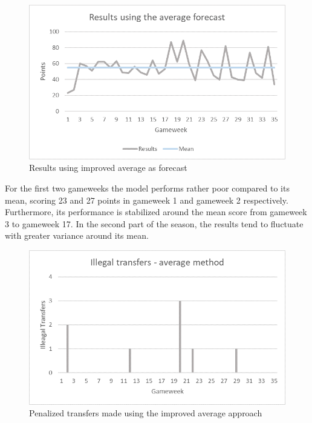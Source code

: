 \begin{figure}[H]
    \centering
    \includegraphics[scale=0.80]{fig/chapter_7/Results_average.png}
    \caption{Results using improved average as forecast}
\label{Results_average}    
\end{figure}
For the first two gameweeks the model performs rather poor compared to its mean, scoring 23 and 27 points in gameweek 1 and gameweek 2 respectively. Furthermore, its performance is stabilized around the mean score from gameweek 3 to gameweek 17. In the second part of the season, the results tend to fluctuate with greater variance around its mean. 
\begin{figure}[H]
    \centering
    \includegraphics[scale=0.80]{fig/chapter_7/Transfers_average.png}
    \caption{Penalized transfers made using the improved average approach}
\label{Transfers_average}    
\end{figure}
